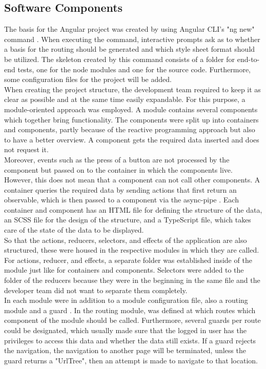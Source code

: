 \documentclass[Bachelor,BIF,english]{twbook}
\begin{document}
\subsection{Software Components}
The basis for the Angular project was created by using Angular CLI's \cite{AngularCli} "ng new" command \cite{AngularCli}. When executing the command, interactive prompts ask as to whether a basis for the routing should be generated and which style sheet format should be utilized. The skeleton created by this command consists of a folder for end-to-end tests, one for the node modules and one for the source code. Furthermore, some configuration files for the project will be added.
\\[\baselineskip]
When creating the project structure, the development team required to keep it as clear as possible and at the same time easily expandable. For this purpose, a module-oriented approach was employed. A module contains several components which together bring functionality. The components were split up into containers and components, partly because of the reactive programming approach but also to have a better overview. A component gets the required data inserted and does not request it.
\\[\baselineskip]
Moreover, events such as the press of a button are not processed by the component but passed on to the container in which the components live. However, this does not mean that a component can not call other components. A container queries the required data by sending actions that first return an observable, which is then passed to a component via the async-pipe \cite{AngularAsyncPipe}. Each container and component has an HTML file for defining the structure of the data, an SCSS \cite{Sass} file for the design of the structure, and a TypeScript file, which takes care of the state of the data to be displayed.
\\[\baselineskip]
So that the actions, reducers, selectors, and effects of the application are also structured, these were housed in the respective modules in which they are called. For actions, reducer, and effects, a separate folder was established inside of the module just like for containers and components. Selectors were added to the folder of the reducers because they were in the beginning in the same file and the developer team did not want to separate them completely.
\\[\baselineskip]
In each module were in addition to a module configuration file, also a routing module and a guard \cite{AngularGuard}. In the routing module, was defined at which routes which component of the module should be called. Furthermore, several guards per route could be designated, which usually made sure that the logged in user has the privileges to access this data and whether the data still exists. If a guard rejects the navigation, the navigation to another page will be terminated, unless the guard returns a "UrlTree", then an attempt is made to navigate to that location.
\end{document}
